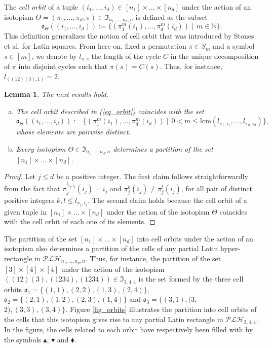 \documentclass{article}
\newtheorem{lem}[thm]{Lemma}
\newcommand{\IN}{\ensuremath{{\mathbb N}}}
\begin{document}
The {\em cell orbit} of a tuple $(i_1,\ldots,i_d)\in [n_1]\times\ldots\times [n_d]$ under the action of an isotopism $\Theta=(\pi_1,\ldots,\pi_d,\pi)\in \mathfrak{I}_{n_1,\ldots,n_d,n}$ is defined as the subset
\begin{equation}\label{eq_orbit}
\mathfrak{o}_{\Theta}((i_1,\ldots,i_d)):= \{(\pi^m_1(i_1),\ldots,\pi^m_d(i_d))\mid\, m\in\IN\}.
\end{equation}
This definition generalizes the notion of cell orbit that was introduced by Stones et al. \cite{Stones2012} for Latin squares. From here on, fixed a permutation $\pi\in S_m$ and a symbol $s\in [m]$, we denote by $l_{\pi,s}$ the length of the cycle $C$ in the unique decomposition of $\pi$ into disjoint cycles such that \mbox{$\pi(s)=C(s)$}. Thus, for instance, $l_{((12)(3),1)}=2$.

\begin{lem}\label{lem_card_orbit} The next results hold.
\begin{enumerate}[a)]
\item The cell orbit described in (\ref{eq_orbit}) coincides with the set
\[\mathfrak{o}_{\Theta}((i_1,\ldots,i_d)):= \{(\pi^m_1(i_1),\ldots,\pi^m_d(i_d))\mid\, 0<m\leq \mathrm{lcm}(l_{\pi_1,i_1},\ldots,l_{\pi_d,i_d})\},\]
whose elements are pairwise distinct.
\item Every isotopism $\Theta\in\mathfrak{I}_{n_1,\ldots,n_d,n}$ determines a partition of the set $[n_1]\times\ldots\times [n_d]$.
\end{enumerate}
\end{lem}

\begin{proof} Let $j\leq d$ be a positive integer. The first claim follows straightforwardly from the fact that $\pi_j^{l_{\pi_j,i_j}}(i_j)=i_j$ and $\pi_j^k(i_j)\neq\pi_j^l(i_j)$, for all pair of distinct positive integers $k,l\leq l_{\pi_j,i_j}$. The second claim holds because the cell orbit of a given tuple in $[n_1]\times\ldots\times [n_d]$ under the action of the isotopism $\Theta$ coincides with the cell orbit of each one of its elements.
\end{proof}

The partition of the set $[n_1]\times\ldots\times [n_d]$ into cell orbits under the action of an isotopism also determines a partition of the cells of any partial Latin hyper-rectangle in $\mathcal{PLH}_{n_1,\ldots,n_d,n}$. Thus, for instance, the partition of the set $[3]\times [4]\times [4]$ under the action of the isotopism $((12)(3),(1234),(1234))\in \mathfrak{I}_{3,4,4}$ is the set formed by the three cell orbits $\mathfrak{o}_1=\{(1,1),(2,2),(1,3),(2,4)\}$, $\mathfrak{o}_2=\{(2,1),(1,2),(2,3),(1,4)\}$ and $\mathfrak{o}_3=\{(3,1),(3,$ $2),(3,3),(3,4)\}$. Figure \ref{fig_orbits} illustrates the partition into cell orbits of the cells that this isotopism gives rise to any partial Latin rectangle in $\mathcal{PLH}_{3,4,4}$. In the figure, the cells related to each orbit have respectively been filled with by the symbols $\blacktriangle$, $\blacktriangledown$ and $\blacklozenge$.
\end{document}
